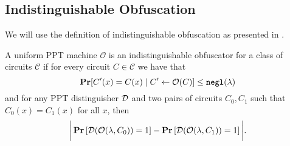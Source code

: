 \subsection{Indistinguishable Obfuscation}
We will use the definition of indistinguishable obfuscation as presented in \cite{garg2016candidate}.
\begin{definition}
	A uniform PPT machine $\mathcal{O}$ is an indistinguishable obfuscator for a class of circuits $\mathcal{C}$ if for every circuit $C \in \mathcal{C}$
	we have that
	\begin{equation*}
		\operatorname*{\mathbf{Pr}}[C'(x) = C(x) \mid C' \gets \mathcal{O}(C)] \leq \texttt{negl}(\lambda)
	\end{equation*}
	and for any PPT distinguisher $\mathcal{D}$ and two pairs of circuits $C_0, C_1$ such that
	$C_0(x) = C_1(x)$ for all $x$, then
	\begin{equation*}
		\bigg|\operatorname*{\mathbf{Pr}}\left[\mathcal{D}(\mathcal{O}(\lambda, C_0)) = 1\right] - \operatorname*{\mathbf{Pr}}\left[\mathcal{D}(\mathcal{O}(\lambda, C_1)) = 1\right]\bigg|.
	\end{equation*}
	
\end{definition}




